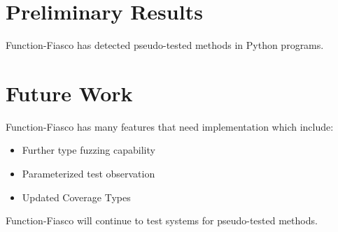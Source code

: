 \documentclass[a0paper,fleqn]{betterposter}
\begin{document}
{%
}{
\section{Preliminary Results}


Function-Fiasco has detected pseudo-tested methods in Python programs.

\section{Future Work}
Function-Fiasco has many features that need implementation which include:\\
\begin{itemize}[leftmargin=*]
\item{Further type fuzzing capability}
\item{Parameterized test observation}
\item{Updated Coverage Types}
\end{itemize}
\vspace{1em}
Function-Fiasco will continue to test systems for pseudo-tested methods.

}
\end{document}
